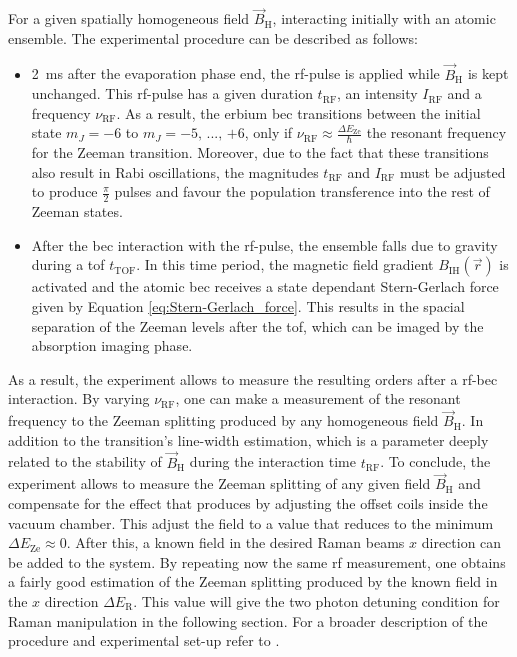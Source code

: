 For a given spatially homogeneous field $\vec{B}_\text{H}$, interacting initially with an atomic ensemble. The experimental procedure can be described as follows:
\begin{itemize}
	\item \SI{2}{\milli\second} after the evaporation phase end, the \ac{rf}-pulse is applied while $\vec{B}_\text{H}$ is kept unchanged. This \ac{rf}-pulse has a given duration $t_\text{RF}$, an intensity $I_\text{RF}$ and a frequency $\nu_\text{RF}$. As a result, the erbium \ac{bec} transitions between the initial state $m_J=-6$ to $m_J=-5\text{, ..., +6}$, only if $\nu_\text{RF}\approx\frac{\Delta E_\text{Ze}}{\hbar}$ the resonant frequency for the Zeeman transition. Moreover, due to the fact that these transitions also result in Rabi oscillations, the magnitudes $t_\text{RF}$ and $I_\text{RF}$ must be adjusted to produce $\frac{\pi}{2}$ pulses and favour the population transference into the rest of Zeeman states.
	\item After the \ac{bec} interaction with the \ac{rf}-pulse, the ensemble falls due to gravity during a \acl{tof} $t_\text{TOF}$. In this time period, the magnetic field gradient $B_\text{IH}(\vec{r})$ is activated and the atomic \ac{bec} receives a state dependant Stern-Gerlach force given by Equation \eqref{eq:Stern-Gerlach_force}. This results in the spacial separation of the Zeeman levels after the \ac{tof}, which can be imaged by the absorption imaging phase.
\end{itemize}

As a result, the experiment allows to measure the resulting orders after a \ac{rf}-\ac{bec} interaction. By varying $\nu_\text{RF}$, one can make a measurement of the resonant frequency to the Zeeman splitting produced by any homogeneous field $\vec{B}_\text{H}$. In addition to the transition's line-width estimation, which is a parameter deeply related to the stability of $\vec{B}_\text{H}$ during the interaction time $t_\text{RF}$. To conclude, the experiment allows to measure the Zeeman splitting of any given field $\vec{B}_\text{H}$ and compensate for the effect that produces by adjusting the offset coils inside the vacuum chamber. This adjust the field to a value that reduces to the minimum  $\Delta E_\text{Ze}\approx0$. After this, a known field in the desired Raman beams $x$ direction can be added to the system. By repeating now the same \ac{rf} measurement, one obtains a fairly good estimation of the Zeeman splitting produced by the known field in the $x$ direction $\Delta E_\text{R}$. This value will give the two photon detuning condition for Raman manipulation in the following section. For a broader description of the procedure and experimental set-up refer to \cite{Ulitzsch2016}.


